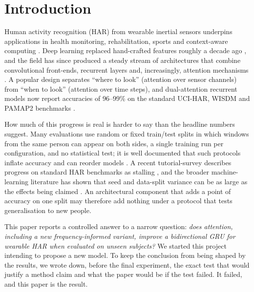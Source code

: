 \documentclass[11pt,a4paper]{article}
\begin{document}
\section{Introduction}

Human activity recognition (HAR) from wearable inertial sensors underpins applications in health monitoring, rehabilitation, sports and context-aware computing \cite{bulling2014tutorial,chen2021deep}. Deep learning replaced hand-crafted features roughly a decade ago \cite{hammerla2016deep,ordonez2016deep,ronao2016human,jiang2015human,wang2019deep}, and the field has since produced a steady stream of architectures that combine convolutional front-ends, recurrent layers and, increasingly, attention mechanisms \cite{zeng2018understanding,murahari2018attention,ma2019attnsense,gao2021danhar,pan2022gru,zhang2025dualinaba,he2025tgahar}. A popular design separates ``where to look'' (attention over sensor channels) from ``when to look'' (attention over time steps), and dual-attention recurrent models now report accuracies of 96--99\% on the standard UCI-HAR, WISDM and PAMAP2 benchmarks \cite{zhang2025dualinaba,he2025tgahar}.

How much of this progress is real is harder to say than the headline numbers suggest. Many evaluations use random or fixed train/test splits in which windows from the same person can appear on both sides, a single training run per configuration, and no statistical test; it is well documented that such protocols inflate accuracy and can reorder models \cite{hammerla2016deep,gholamiangonabadi2020deep,jordao2018human}. A recent tutorial-survey describes progress on standard HAR benchmarks as stalling \cite{haresamudram2024past}, and the broader machine-learning literature has shown that seed and data-split variance can be as large as the effects being claimed \cite{bouthillier2021accounting,lipton2019troubling}. An architectural component that adds a point of accuracy on one split may therefore add nothing under a protocol that tests generalisation to new people.

This paper reports a controlled answer to a narrow question: \emph{does attention, including a new frequency-informed variant, improve a bidirectional GRU for wearable HAR when evaluated on unseen subjects?} We started this project intending to propose a new model. To keep the conclusion from being shaped by the results, we wrote down, before the final experiment, the exact test that would justify a method claim and what the paper would be if the test failed. It failed, and this paper is the result.
\end{document}
